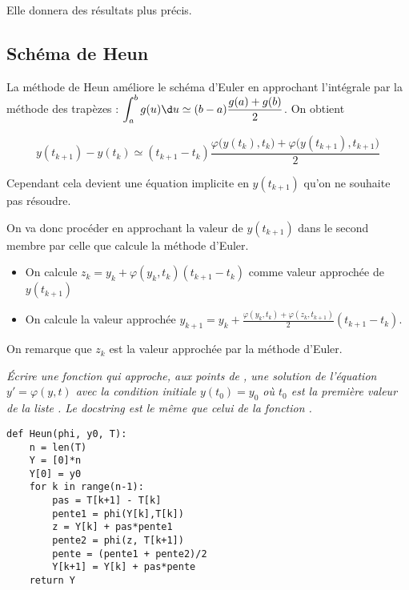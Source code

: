 Elle donnera des résultats plus précis.
\subsection{Schéma de Heun}
La méthode de Heun améliore le schéma d'Euler en approchant l'intégrale par la méthode des trapèzes : $\displaystyle \int_{a}^b g(u) \d u\simeq (b-a)\frac{g(a)+g(b)}2$. On obtient

\[ y(t_{k+1})-y(t_k)\simeq  (t_{k+1}-t_k) \frac {\varphi\bigl(y(t_k),t_k\bigr)+\varphi\bigl(y(t_{k+1}),t_{k+1}\bigr)}2 \]

Cependant cela devient une équation implicite en $y(t_{k+1})$ qu'on ne souhaite pas résoudre.

On va donc procéder en approchant la valeur de $y(t_{k+1})$ dans le second membre par celle que calcule la méthode d'Euler.
\begin{itemize}
\item On calcule $z_k=y_k+\varphi(y_k,t_k)(t_{k+1}-t_k)$ comme valeur approchée de $y(t_{k+1})$
\item On calcule la valeur approchée $\displaystyle y_{k+1} = y_k +
\frac{\varphi(y_k,t_k)+\varphi(z_k,t_{k+1})} 2 (t_{k+1}-t_k)$.
\end{itemize}
On remarque que $z_k$ est la valeur approchée par la méthode d'Euler.
\begin{Exercise}\it
Écrire une fonction  qui approche, aux points de , une solution de l'équation $y'=\varphi(y, t)$ avec la condition initiale $y(t_0) = y_0$ où $t_0$ est la première valeur de la liste . Le docstring est le même que celui de la fonction .
\end{Exercise}
\begin{Answer}
\begin{lstlisting}
def Heun(phi, y0, T):
    n = len(T)           
    Y = [0]*n            
    Y[0] = y0  
    for k in range(n-1):
        pas = T[k+1] - T[k]
        pente1 = phi(Y[k],T[k])
        z = Y[k] + pas*pente1
        pente2 = phi(z, T[k+1])
        pente = (pente1 + pente2)/2
        Y[k+1] = Y[k] + pas*pente 
    return Y
\end{lstlisting}
\end{Answer}
